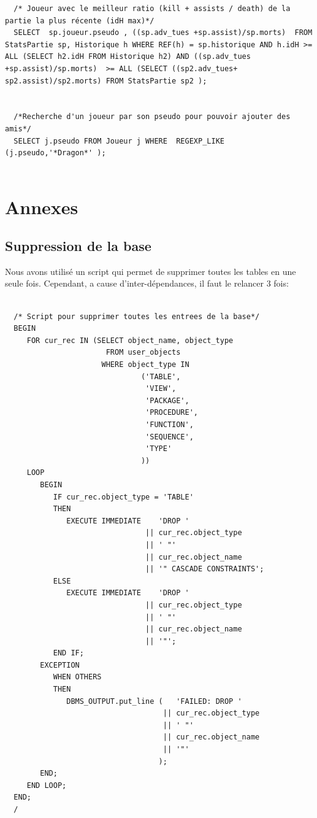 \documentclass[a4paper,10pt]{report}
\begin{document}
\begin{lstlisting}
  /* Joueur avec le meilleur ratio (kill + assists / death) de la partie la plus récente (idH max)*/
  SELECT  sp.joueur.pseudo , ((sp.adv_tues +sp.assist)/sp.morts)  FROM StatsPartie sp, Historique h WHERE REF(h) = sp.historique AND h.idH >= ALL (SELECT h2.idH FROM Historique h2) AND ((sp.adv_tues +sp.assist)/sp.morts)  >= ALL (SELECT ((sp2.adv_tues+ sp2.assist)/sp2.morts) FROM StatsPartie sp2 );


  /*Recherche d'un joueur par son pseudo pour pouvoir ajouter des amis*/
  SELECT j.pseudo FROM Joueur j WHERE  REGEXP_LIKE (j.pseudo,'*Dragon*' );


\end{lstlisting}




\chapter{Annexes} %
\section{Suppression de la base}
Nous avons utilisé un script qui permet de supprimer toutes les tables en une seule fois. Cependant, a cause d'inter-dépendances, il faut le relancer 3 fois:
\begin{lstlisting}

  /* Script pour supprimer toutes les entrees de la base*/
  BEGIN
     FOR cur_rec IN (SELECT object_name, object_type
                       FROM user_objects
                      WHERE object_type IN
                               ('TABLE',
                                'VIEW',
                                'PACKAGE',
                                'PROCEDURE',
                                'FUNCTION',
                                'SEQUENCE',
                                'TYPE'
                               ))
     LOOP
        BEGIN
           IF cur_rec.object_type = 'TABLE'
           THEN
              EXECUTE IMMEDIATE    'DROP '
                                || cur_rec.object_type
                                || ' "'
                                || cur_rec.object_name
                                || '" CASCADE CONSTRAINTS';
           ELSE
              EXECUTE IMMEDIATE    'DROP '
                                || cur_rec.object_type
                                || ' "'
                                || cur_rec.object_name
                                || '"';
           END IF;
        EXCEPTION
           WHEN OTHERS
           THEN
              DBMS_OUTPUT.put_line (   'FAILED: DROP '
                                    || cur_rec.object_type
                                    || ' "'
                                    || cur_rec.object_name
                                    || '"'
                                   );
        END;
     END LOOP;
  END;
  /
\end{lstlisting}
\end{document}
